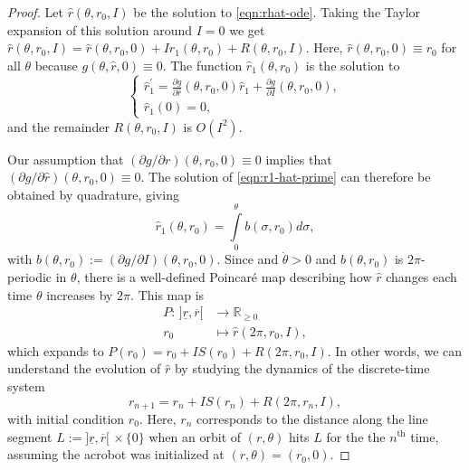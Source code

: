 \documentclass[journal,twoside,web]{ieeecolor}
\begin{document}
{\begin{proof}
    Let \(\hat{r}(\theta,r_0,I)\) be the solution to \eqref{eqn:rhat-ode}.
    Taking the Taylor expansion of this solution around \(I = 0\) we get
    \(\hat{r}(\theta,r_0,I) = \hat{r}(\theta,r_0,0) + I\hat{r}_1(\theta,r_0) 
    + R(\theta,r_0,I)\). 
    Here, \(\hat{r}(\theta,r_0,0) \equiv r_0\) for all \(\theta\) because
    \(g(\theta,\hat{r},0) \equiv 0\).
    The function \(\hat{r}_1(\theta,r_0)\) is the solution to
    \begin{equation}\label{eqn:r1-hat-prime}
        \begin{cases}
        \hat{r}_1^\prime = 
        \frac{\partial g}{\partial \hat{r}}(\theta,r_0,0)\hat{r}_1 +
        \frac{\partial g}{\partial I}(\theta,r_0,0)
        , \\
        \hat{r}_1(0) = 0
        ,
    \end{cases}
    \end{equation}
    and the remainder \(R(\theta,r_0,I)\) is \(O(I^2)\).

    Our assumption that \((\partial g/\partial r)(\theta,r_0,0) \equiv 0\)
    implies that \((\partial g/\partial \hat{r})(\theta,r_0,0) \equiv 0\).
    The solution of \ref{eqn:r1-hat-prime} can therefore be obtained by
    quadrature, giving
    \[
        \hat{r}_1(\theta,r_0) = \int\limits_0^\theta b(\sigma,r_0)d\sigma
        ,
    \]
    with \(b(\theta,r_0) := (\partial g/\partial I)(\theta,r_0,0)\). 
    Since and \(\dot{\theta} > 0\) and \(b(\theta,r_0)\) is \(2\pi\)-periodic in
    \(\theta\), there is a well-defined Poincar\'{e} map describing
    how \(\hat{r}\) changes each time \(\theta\) increases by \(2\pi\).
    This map is 
    \begin{align}\label{eqn:poincare-map}
        P : \, ]\underline{r},\overline{r}[ &\to \mathbb{R}_{\geq 0} \\
        r_0 &\mapsto \hat{r}(2\pi,r_0,I)
        ,
    \end{align}
    which expands to \(P(r_0) = r_0 + IS(r_0) + R(2\pi,r_0,I)\).
    In other words, we can understand the evolution of \(\hat{r}\) by studying
    the dynamics of the discrete-time system
    \begin{equation}\label{eqn:r-discrete}
        r_{n+1} = r_n + IS(r_n) + R(2\pi,r_n,I)
        ,
    \end{equation}
    with initial condition \(r_0\).
    Here, \(r_n\) corresponds to the distance along the line segment
    \(L := ]\underline{r},\overline{r}[ \, \times \{0\}\)
    when an orbit of \((r,\theta)\) hits \(L\) for the the \(n^\text{th}\) time,
    assuming the acrobot was initialized at \((r,\theta) = (r_0,0)\).


\end{proof}}
\end{document}

